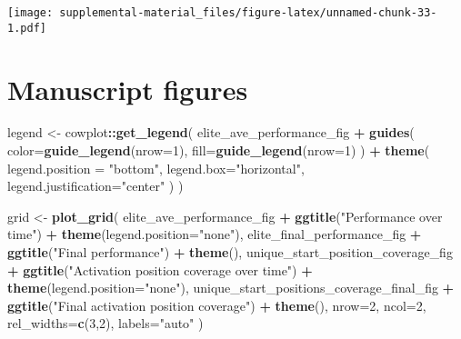\documentclass[]{book}
\newenvironment{Shaded}{\begin{snugshade}}{\end{snugshade}}
\newcommand{\DataTypeTok}[1]{\textcolor[rgb]{0.13,0.29,0.53}{#1}}
\newcommand{\DecValTok}[1]{\textcolor[rgb]{0.00,0.00,0.81}{#1}}
\newcommand{\KeywordTok}[1]{\textcolor[rgb]{0.13,0.29,0.53}{\textbf{#1}}}
\newcommand{\NormalTok}[1]{#1}
\newcommand{\OperatorTok}[1]{\textcolor[rgb]{0.81,0.36,0.00}{\textbf{#1}}}
\newcommand{\StringTok}[1]{\textcolor[rgb]{0.31,0.60,0.02}{#1}}
\begin{document}
\texttt{[image: supplemental-material\_files/figure-latex/unnamed-chunk-33-1.pdf]}

\hypertarget{manuscript-figures-2}{%
\section{Manuscript figures}\label{manuscript-figures-2}}

\begin{Shaded}
\begin{Highlighting}[]
\NormalTok{legend <-}\StringTok{ }\NormalTok{cowplot}\OperatorTok{::}\KeywordTok{get_legend}\NormalTok{(}
\NormalTok{    elite_ave_performance_fig }\OperatorTok{+}
\StringTok{      }\KeywordTok{guides}\NormalTok{(}
        \DataTypeTok{color=}\KeywordTok{guide_legend}\NormalTok{(}\DataTypeTok{nrow=}\DecValTok{1}\NormalTok{),}
        \DataTypeTok{fill=}\KeywordTok{guide_legend}\NormalTok{(}\DataTypeTok{nrow=}\DecValTok{1}\NormalTok{)}
\NormalTok{      ) }\OperatorTok{+}
\StringTok{      }\KeywordTok{theme}\NormalTok{(}
        \DataTypeTok{legend.position =} \StringTok{"bottom"}\NormalTok{,}
        \DataTypeTok{legend.box=}\StringTok{"horizontal"}\NormalTok{,}
        \DataTypeTok{legend.justification=}\StringTok{"center"}
\NormalTok{      )}
\NormalTok{  )}

\NormalTok{grid <-}\StringTok{ }\KeywordTok{plot_grid}\NormalTok{(}
\NormalTok{  elite_ave_performance_fig }\OperatorTok{+}
\StringTok{    }\KeywordTok{ggtitle}\NormalTok{(}\StringTok{"Performance over time"}\NormalTok{) }\OperatorTok{+}
\StringTok{    }\KeywordTok{theme}\NormalTok{(}\DataTypeTok{legend.position=}\StringTok{"none"}\NormalTok{),}
\NormalTok{  elite_final_performance_fig }\OperatorTok{+}
\StringTok{    }\KeywordTok{ggtitle}\NormalTok{(}\StringTok{"Final performance"}\NormalTok{) }\OperatorTok{+}
\StringTok{    }\KeywordTok{theme}\NormalTok{(),}
\NormalTok{  unique_start_position_coverage_fig }\OperatorTok{+}
\StringTok{    }\KeywordTok{ggtitle}\NormalTok{(}\StringTok{"Activation position coverage over time"}\NormalTok{) }\OperatorTok{+}
\StringTok{    }\KeywordTok{theme}\NormalTok{(}\DataTypeTok{legend.position=}\StringTok{"none"}\NormalTok{),}
\NormalTok{  unique_start_positions_coverage_final_fig }\OperatorTok{+}
\StringTok{    }\KeywordTok{ggtitle}\NormalTok{(}\StringTok{"Final activation position coverage"}\NormalTok{) }\OperatorTok{+}
\StringTok{    }\KeywordTok{theme}\NormalTok{(),}
  \DataTypeTok{nrow=}\DecValTok{2}\NormalTok{,}
  \DataTypeTok{ncol=}\DecValTok{2}\NormalTok{,}
  \DataTypeTok{rel_widths=}\KeywordTok{c}\NormalTok{(}\DecValTok{3}\NormalTok{,}\DecValTok{2}\NormalTok{),}
  \DataTypeTok{labels=}\StringTok{"auto"}
\NormalTok{)}


\end{Highlighting}
\end{Shaded}
\end{document}
